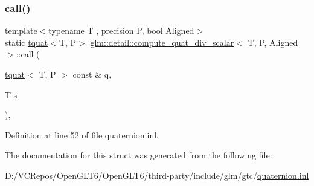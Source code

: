 \subsubsection{\texorpdfstring{call()}{call()}}
{\footnotesize\ttfamily template$<$typename T , precision P, bool Aligned$>$ \\
static \mbox{\hyperlink{structglm_1_1tquat}{tquat}}$<$T, P$>$ \mbox{\hyperlink{structglm_1_1detail_1_1compute__quat__div__scalar}{glm\+::detail\+::compute\+\_\+quat\+\_\+div\+\_\+scalar}}$<$ T, P, Aligned $>$\+::call (\begin{DoxyParamCaption}\item[{\mbox{\hyperlink{structglm_1_1tquat}{tquat}}$<$ T, P $>$ const \&}]{q,  }\item[{T}]{s }\end{DoxyParamCaption})\hspace{0.3cm}{\ttfamily [inline]}, {\ttfamily [static]}}



Definition at line 52 of file quaternion.\+inl.



The documentation for this struct was generated from the following file\+:\begin{DoxyCompactItemize}
\item 
D\+:/\+V\+C\+Repos/\+Open\+G\+L\+T6/\+Open\+G\+L\+T6/third-\/party/include/glm/gtc/\mbox{\hyperlink{gtc_2quaternion_8inl}{quaternion.\+inl}}\end{DoxyCompactItemize}
